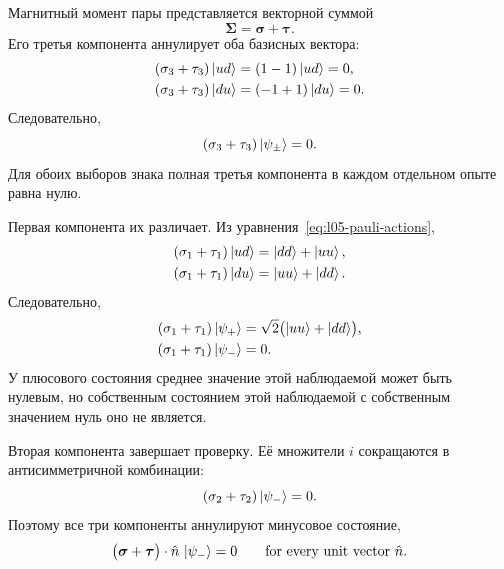 Магнитный момент пары представляется векторной суммой
\begin{equation}
  \boldsymbol{\Sigma}
  =
  \boldsymbol{\sigma}+\boldsymbol{\tau}.
\end{equation}
Его третья компонента аннулирует оба базисных вектора:
\begin{align}
  (\sigma_3+\tau_3)\left\lvert ud\right\rangle
  &=(1-1)\left\lvert ud\right\rangle=0,\nonumber\\
  (\sigma_3+\tau_3)\left\lvert du\right\rangle
  &=(-1+1)\left\lvert du\right\rangle=0.
\end{align}
Следовательно,
\begin{equation}
  (\sigma_3+\tau_3)\left\lvert\psi_\pm\right\rangle=0.
\end{equation}
Для обоих выборов знака полная третья компонента в каждом отдельном опыте равна нулю.

Первая компонента их различает. Из уравнения~\eqref{eq:l05-pauli-actions},
\begin{align}
  (\sigma_1+\tau_1)\left\lvert ud\right\rangle
  &=\left\lvert dd\right\rangle+\left\lvert uu\right\rangle,\nonumber\\
  (\sigma_1+\tau_1)\left\lvert du\right\rangle
  &=\left\lvert uu\right\rangle+\left\lvert dd\right\rangle.
\end{align}
Следовательно,
\begin{align}
  (\sigma_1+\tau_1)\left\lvert\psi_+\right\rangle
  &=
  \sqrt2\bigl(\left\lvert uu\right\rangle+\left\lvert dd\right\rangle\bigr),\nonumber\\
  (\sigma_1+\tau_1)\left\lvert\psi_-\right\rangle
  &=0.
  \label{eq:l05-total-x}
\end{align}
У плюсового состояния среднее значение этой наблюдаемой может быть нулевым, но собственным состоянием этой наблюдаемой с собственным значением нуль оно не является.

\begin{classroomqa}
\end{classroomqa}

Вторая компонента завершает проверку. Её множители \(i\) сокращаются в антисимметричной комбинации:
\begin{equation}
  (\sigma_2+\tau_2)\left\lvert\psi_-\right\rangle=0.
\end{equation}
Поэтому все три компоненты аннулируют минусовое состояние,
\begin{equation}
  \bigl(\boldsymbol{\sigma}+\boldsymbol{\tau}\bigr)
  \cdot\hat n\,\left\lvert\psi_-\right\rangle=0
  \qquad\text{for every unit vector }\hat n.
  \label{eq:l05-singlet-any-axis}
\end{equation}

